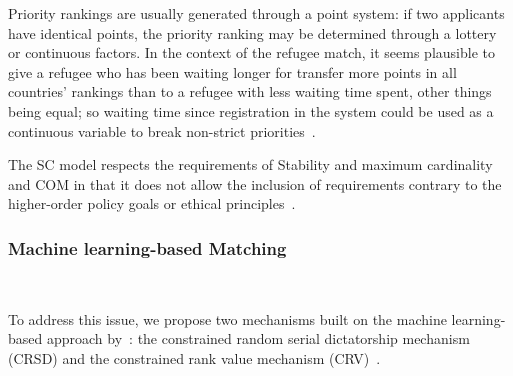 Priority rankings are usually generated through a point system: if two applicants have identical points, the priority ranking may be determined through a lottery or continuous factors.
In the context  of the refugee match, it seems plausible to give a refugee who has been waiting longer for transfer  more points in all countries’ rankings than to a refugee with less waiting time spent, other things being  equal;
so waiting time since registration in the system could be used as a continuous variable to break non-strict priorities~\cite{basshuysen}.

The SC model respects the requirements of Stability and maximum cardinality and COM in that it does not allow the inclusion of requirements contrary to the higher-order policy goals or ethical principles~\cite{basshuysen}.

\subsubsection{Machine learning-based Matching}\label{machine-learning-based-matching}~\citet{olbergml}

To address this issue, we propose two mechanisms built on the machine learning-based approach by~\citet{bansak_2018}: the constrained random serial dictatorship mechanism
(CRSD) and the constrained rank value mechanism (CRV)~\citet{olbergml}.



